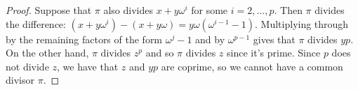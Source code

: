 \begin{proof}
    Suppose that $\pi$ also divides $x+y\omega^i$ for some $i = 2,\ldots,p$. Then $\pi$ divides the difference: $(x+y\omega^i) - (x+y\omega) = y\omega(\omega^{i-1}-1)$. Multiplying through by the remaining factors of the form $\omega^j-1$ and by $\omega^{p-1}$ gives that $\pi$ divides $yp$. On the other hand, $\pi$ divides $z^p$ and so $\pi$ divides $z$ since it's prime. Since $p$ does not divide $z$, we have that $z$ and $yp$ are coprime, so we cannot have a common divisor $\pi$.
\end{proof}